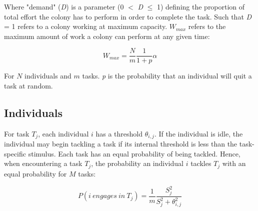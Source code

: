 \documentclass[a4paper]{article}
\begin{document}
Where "demand" (\textit{D}) is a parameter (0 $<$ \textit{D} $\leq$ 1) defining the proportion of total effort the colony has to perform in order to complete the task. Such that \textit{D} = 1 refers to a colony working at maximum capacity. $W_{max}$ refers to the maximum amount of work a colony can perform at any given time:

\begin{equation}
W_{max} = \frac{N}{m}\frac{1}{1 + p}\alpha
\end{equation}


For $N$ individuals and $m$ tasks. \textit{p} is the probability that an individual will quit a task at random.









\subsection{Individuals}
For task $T_j$, each individual $i$ has a threshold $\theta_{i,j}$.  If the individual is idle, the individual may begin tackling a task if its internal threshold is less than the task-specific stimulus.  Each task has an equal probability of being tackled. Hence, when encountering a task $T_j$, the probability an individual $i$ tackles $T_j$ with an equal probability for $M$ tasks:

\begin{equation}
P(i\:engages\:in\:T_j) = \frac{1}{m} \frac{S_j^2}{S_j^2 + \theta_{i,j}^2}
\end{equation}
\end{document}
